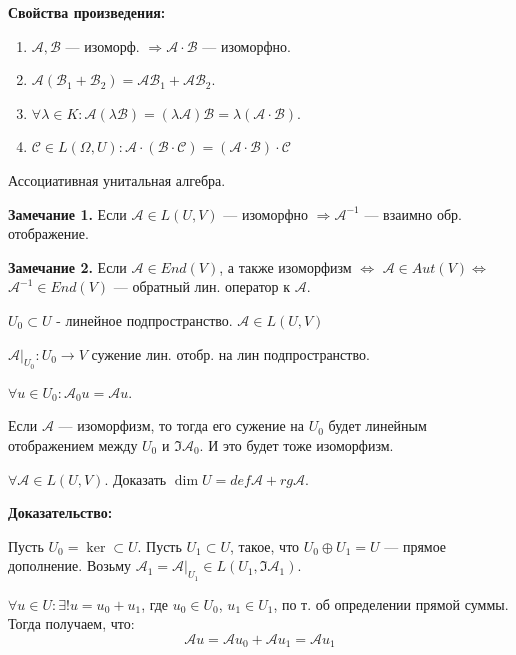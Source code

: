 \textbf{Свойства произведения:}
\begin{enumerate}
    \item $\mathcal{A}, \mathcal{B}$ --- изоморф. $\Rightarrow \mathcal{A} \cdot \mathcal{B}$ --- изоморфно.
    \item $\mathcal{A}(\mathcal{B}_1 + \mathcal{B}_2) =  \mathcal{A} \mathcal{B}_1 + \mathcal{A} \mathcal{B}_2$.
    \item  $\forall \lambda \in K: \mathcal{A}(\lambda \mathcal{B}) = (\lambda \mathcal{A}) \mathcal{B} = \lambda (\mathcal{A} \cdot \mathcal{B})$.
    \item $\mathcal{C} \in L(\Omega, U): \mathcal{A} \cdot (\mathcal{B}\cdot \mathcal{C}) = (\mathcal{A}\cdot \mathcal{B}) \cdot \mathcal{C}$
\end{enumerate}

Ассоциативная унитальная алгебра.

    \textbf{Замечание 1.} Если $\mathcal{A} \in L(U,V)$ --- изоморфно $\Rightarrow \mathcal{A}^{-1}$ --- взаимно обр. отображение.

\textbf{Замечание 2.} Если $\mathcal{A} \in End(V)$, а также изоморфизм $\Leftrightarrow$ $\mathcal{A} \in Aut(V) \Leftrightarrow$ $\mathcal{A}^{-1}\in End(V)$ --- обратный лин. оператор к $\mathcal{A}$.  

 $U_0 \subset U$ - линейное подпространство. $\mathcal{A} \in L(U,V)$

$\mathcal{A}|_{U_0}: U_0 \rightarrow V$ сужение лин. отобр. на лин подпространство.

$\forall u \in U_0:\mathcal{A}_0 u = \mathcal{A}u$.

Если $\mathcal{A}$ --- изоморфизм, то тогда его сужение на $U_0$ будет линейным отображением между $U_0$ и $\Im \mathcal{A}_0$. И это будет тоже изоморфизм.



$\forall \mathcal{A} \in L(U, V)$. Доказать $\dim U = def \mathcal{A} + rg \mathcal{A}$.


\textbf{Доказательство:}


Пусть $ U_0 = \ker \subset U$.  Пусть $ U_1 \subset U$, такое, что $U_0 \oplus U_1 = U$ --- прямое дополнение. Возьму $\mathcal{A}_1 = \mathcal{A}|_{U_1} \in L(U_1, \Im \mathcal{A}_1)$.

$\forall u \in U: \exists! u = u_0 + u_1$, где $u_0 \in U_0$, $u_1 \in U_1$, по т. об определении прямой суммы. Тогда получаем, что:
$$\mathcal{A}u = \mathcal{A}u_0 +\mathcal{A}u_1 = \mathcal{A}u_1$$

